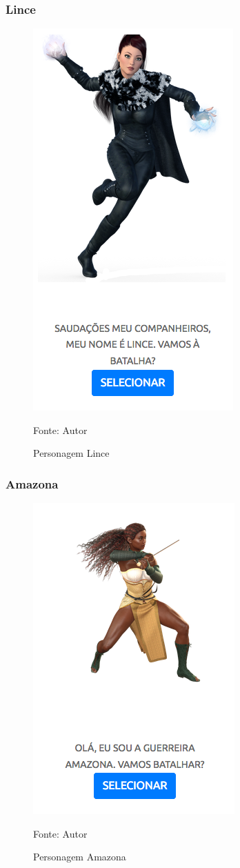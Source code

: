 \subsubsection{Lince}
\begin{figure}[h]
	\centering
	\includegraphics[keepaspectratio=true,scale=0.6]{figuras/lince.png}
	\caption{Personagem Lince}
	Fonte: Autor
	\label{lince}
\end{figure}
\clearpage
\subsubsection{Amazona}
\begin{figure}[h]
	\centering
	\includegraphics[keepaspectratio=true,scale=0.6]{figuras/amazona.png}
	\caption{Personagem Amazona}
	Fonte: Autor
	\label{amazona}
\end{figure}
\clearpage
